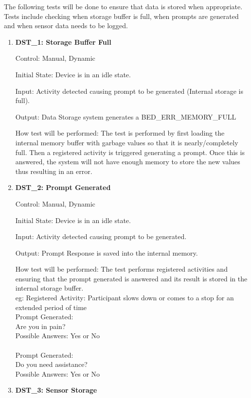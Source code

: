 \documentclass[12pt, titlepage]{article}
\begin{document}
The following tests will be done to ensure that data is stored when appropriate. Tests include checking when storage buffer is full, when prompts are generated and when sensor data needs to be logged. 
\begin{enumerate}
	\item{\textbf{DST\_1: Storage Buffer Full} \\}\label{DST1}
	
		Control: Manual, Dynamic
							
		Initial State: Device is in an idle state.
							
		Input: Activity detected causing prompt to be generated (Internal storage is full).
		
		Output: Data Storage system generates a BED\_ERR\_MEMORY\_FULL
		
		How test will be performed: The test is performed by first loading the internal memory buffer with garbage values so that it is nearly/completely full. Then a registered activity is triggered generating a 					prompt. Once this is answered, the system will not have enough memory to store the new values thus resulting in an error.
\newpage
	\item{\textbf{DST\_2: Prompt Generated} \\}\label{DST2}
	
		Control: Manual, Dynamic
							
		Initial State: Device is in an idle state.
							
		Input: Activity detected causing prompt to be generated.
		
		Output: Prompt Response is saved into the internal memory.
		
		How test will be performed: The test performs registered activities and ensuring that the prompt generated is answered and its result is stored in the internal storage buffer.\\
		eg: Registered Activity: Participant slows down or comes to a stop for an extended period of time\\
		Prompt Generated: \\
		Are you in pain?\\
		Possible Answers: Yes or No\\
		\\
		Prompt Generated: \\
		Do you need assistance?\\
		Possible Answers: Yes or No\\

	\item{\textbf{DST\_3: Sensor Storage} \\}\label{DST3}
	

\end{enumerate}
\end{document}
